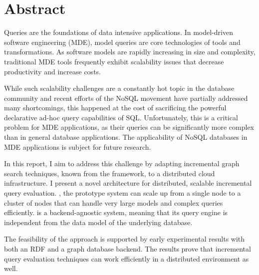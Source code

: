 \chapter*{Abstract}

Queries are the foundations of data intensive applications. In model-driven software engineering (MDE), model queries are core technologies of tools and transformations. As software models are rapidly increasing in size and complexity, traditional MDE tools frequently exhibit scalability issues that decrease productivity and increase costs.

While such scalability challenges are a constantly hot topic in the database community and recent efforts of the NoSQL movement have partially addressed many shortcomings, this happened at the cost of sacrificing the powerful declarative ad-hoc query capabilities of SQL. Unfortunately, this is a critical problem for MDE applications, as their queries can be significantly more complex than in general database applications. The applicability of NoSQL databases in MDE applications is subject for future research.

In this report, I aim to address this challenge by adapting incremental graph search techniques, known from the \eiq{} framework, to a distributed cloud infrastructure. I present a novel architecture for distributed, scalable incremental query evaluation. \iqd{}, the prototype system can scale up from a single node to a cluster of nodes that can handle very large models and complex queries efficiently. \iqd{} is a backend-agnostic system, meaning that its query engine is independent from the data model of the underlying database.

The feasibility of the approach is supported by early experimental results with both an RDF and a graph database backend. The results prove that incremental query evaluation techniques can work efficiently in a distributed environment as well.
 
\vfill
